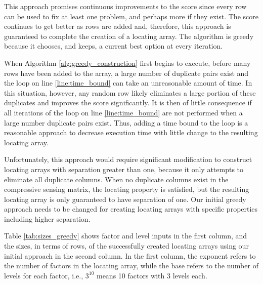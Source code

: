 This approach promises continuous improvements to the score since every row can be used to fix at least one problem, and perhaps more if they exist.
The score continues to get better as rows are added and, therefore, this approach is guaranteed to complete the creation of a locating array.
The algorithm is greedy because it chooses, and keeps, a current best option at every iteration.

When Algorithm \ref{alg:greedy_construction} first begins to execute, before many rows have been added to the array, a large number of duplicate pairs exist and the loop on line \ref{line:time_bound} can take an unreasonable amount of time.
In this situation, however, any random row likely eliminates a large portion of these duplicates and improves the score significantly.
It is then of little consequence if all iterations of the loop on line \ref{line:time_bound} are not performed when a large number duplicate pairs exist.
Thus, adding a time bound to the loop is a reasonable approach to decrease execution time with little change to the resulting locating array.

Unfortunately, this approach would require significant modification to construct locating arrays with separation greater than one, because it only attempts to eliminate all duplicate columns.
When no duplicate columns exist in the compressive sensing matrix, the locating property is satisfied, but the resulting locating array is only guaranteed to have separation of one.
Our initial greedy approach needs to be changed for creating locating arrays with specific properties including higher separation.

Table \ref{tab:sizes_greedy} shows factor and level inputs in the first column, and the sizes, in terms of rows, of the successfully created locating arrays using our initial approach in the second column.
In the first column, the exponent refers to the number of factors in the locating array, while the base refers to the number of levels for each factor, i.e., $3^{10}$ means 10 factors with 3 levels each.

